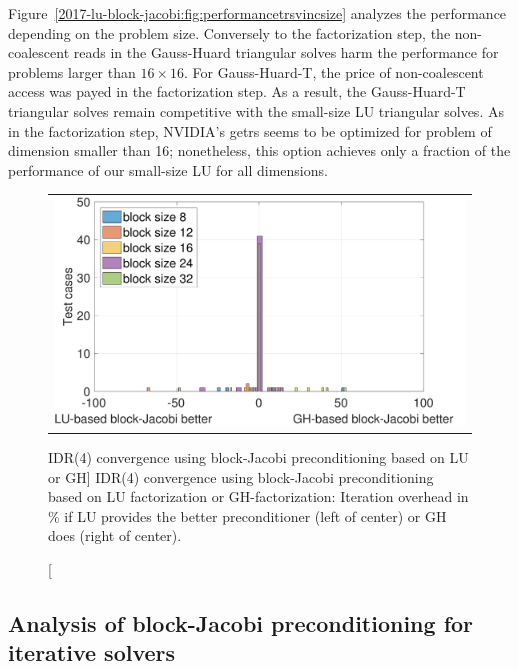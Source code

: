 Figure~\ref{2017-lu-block-jacobi:fig:performancetrsvincsize} analyzes the performance depending on the problem size.
Conversely to the factorization step, the non-coalescent reads in the Gauss-Huard triangular solves 
harm the performance for problems larger than $16\times16$.
For Gauss-Huard-T, the price of non-coalescent access was payed in the factorization step.
As a result, the Gauss-Huard-T triangular solves remain competitive with the
small-size LU triangular solves.
As in the factorization step, NVIDIA's {\sc getrs} seems to be optimized for problem of dimension smaller than 16;
nonetheless, this option achieves only a fraction of the performance of our small-size LU for all dimensions.



\begin{figure}[t]
\begin{center}
\begin{tabular}{c}
\includegraphics[width=.6\columnwidth]{plots/iteration_distribution_LU_GH_new}\\
\end{tabular}
\end{center}
\caption
[IDR(4) convergence using block-Jacobi preconditioning based on LU or GH]
{
IDR(4) convergence using block-Jacobi preconditioning based on LU factorization or GH-factorization: 
Iteration overhead in \% if LU provides the better preconditioner (left of center) or GH does (right of center).
}
\label{2017-lu-block-jacobi:fig:iterdist}
\end{figure}


\subsection{Analysis of block-Jacobi preconditioning for iterative solvers}

